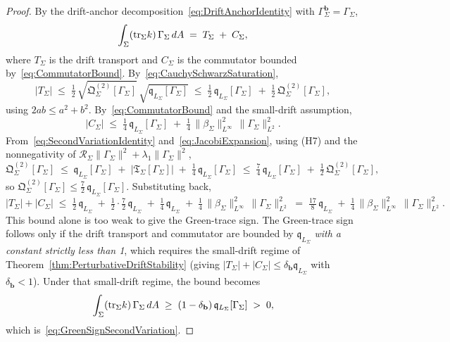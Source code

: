 \begin{proof}
By the drift-anchor decomposition~\eqref{eq:DriftAnchorIdentity} with $\Gamma_\Sigma^{\mathbf b}=\Gamma_\Sigma$,
\[
    \int_\Sigma(\mathrm{tr}_\Sigma k)\,\Gamma_\Sigma\,dA
    \;=\;
    T_\Sigma\;+\;C_\Sigma ,
\]
where $T_\Sigma$ is the drift transport and $C_\Sigma$ is the commutator bounded by~\eqref{eq:CommutatorBound}. By~\eqref{eq:CauchySchwarzSaturation},
\[
    |T_\Sigma|
    \;\le\;
    \tfrac12\,\sqrt{\mathfrak Q_\Sigma^{(2)}[\Gamma_\Sigma]}\,\sqrt{\mathfrak q_{L_\Sigma}[\Gamma_\Sigma]}
    \;\le\;
    \tfrac12\,\mathfrak q_{L_\Sigma}[\Gamma_\Sigma]
    \;+\;\tfrac12\,\mathfrak Q_\Sigma^{(2)}[\Gamma_\Sigma] ,
\]
using $2ab\le a^2+b^2$. By~\eqref{eq:CommutatorBound} and the small-drift assumption,
\[
    |C_\Sigma|\;\le\;\tfrac14\,\mathfrak q_{L_\Sigma}[\Gamma_\Sigma]
    \;+\;\tfrac14\,\|\beta_\Sigma\|_{L^\infty}^2\,\|\Gamma_\Sigma\|_{L^2}^2 .
\]
From~\eqref{eq:SecondVariationIdentity} and~\eqref{eq:JacobiExpansion}, using (H7) and the nonnegativity of $\mathcal R_\Sigma\|\Gamma_\Sigma\|^2+\lambda_1\|\Gamma_\Sigma\|^2$,
\[
    \mathfrak Q_\Sigma^{(2)}[\Gamma_\Sigma]
    \;\le\;
    \mathfrak q_{L_\Sigma}[\Gamma_\Sigma]
    \;+\;|\mathfrak T_\Sigma[\Gamma_\Sigma]|
    \;+\;\tfrac14\,\mathfrak q_{L_\Sigma}[\Gamma_\Sigma]
    \;\le\;
    \tfrac74\,\mathfrak q_{L_\Sigma}[\Gamma_\Sigma]
    \;+\;\tfrac12\,\mathfrak Q_\Sigma^{(2)}[\Gamma_\Sigma] ,
\]
so $\mathfrak Q_\Sigma^{(2)}[\Gamma_\Sigma]\le\tfrac72\,\mathfrak q_{L_\Sigma}[\Gamma_\Sigma]$. Substituting back,
\[
    |T_\Sigma|+|C_\Sigma|
    \;\le\;
    \tfrac12\,\mathfrak q_{L_\Sigma}
    \;+\;\tfrac12\cdot\tfrac72\,\mathfrak q_{L_\Sigma}
    \;+\;\tfrac14\,\mathfrak q_{L_\Sigma}
    \;+\;\tfrac14\,\|\beta_\Sigma\|_{L^\infty}^2\,\|\Gamma_\Sigma\|_{L^2}^2
    \;=\;
    \tfrac{17}{8}\,\mathfrak q_{L_\Sigma}
    \;+\;\tfrac14\,\|\beta_\Sigma\|_{L^\infty}^2\,\|\Gamma_\Sigma\|_{L^2}^2 .
\]
This bound alone is too weak to give the Green-trace sign. The Green-trace sign follows only if the drift transport and commutator are bounded by $\mathfrak q_{L_\Sigma}$ \emph{with a constant strictly less than 1}, which requires the small-drift regime of Theorem~\ref{thm:PerturbativeDriftStability} (giving $|T_\Sigma|+|C_\Sigma|\le\delta_{\mathbf b}\mathfrak q_{L_\Sigma}$ with $\delta_{\mathbf b}<1$). Under that small-drift regime, the bound becomes
\[
    \int_\Sigma(\mathrm{tr}_\Sigma k)\,\Gamma_\Sigma\,dA
    \;\ge\;
    (1-\delta_{\mathbf b})\,\mathfrak q_{L_\Sigma}[\Gamma_\Sigma]
    \;>\;0 ,
\]
which is~\eqref{eq:GreenSignSecondVariation}.
\end{proof}

